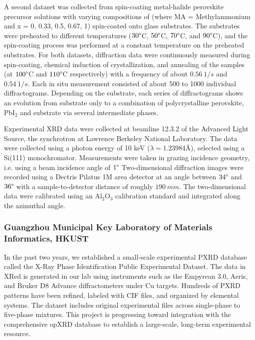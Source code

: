 A second dataset was collected from spin-coating metal-halide perovskite precursor solutions with varying compositions of  (where MA = Methylammonium and x = 0, 0.33, 0.5, 0.67, 1) spin-coated onto glass substrates. The substrates were preheated to different temperatures ($30\degree $C, $50\degree $C, $70\degree $C, and $90\degree $C), and the spin-coating process was performed at a constant temperature on the preheated substrates. For both datasets, diffraction data were continuously measured during spin-coating, chemical induction of crystallization, and annealing of the samples (at $100\degree$C and $110\degree$C respectively) with a frequency of about $0.56 
 \ 1/\si{s}$ and $0.54 \ 1/\si{s}$. Each in situ measurement consisted of about 500 to 1000 individual diffractograms. Depending on the substrate, each series of diffractograms shows an evolution from substrate only to a combination of polycrystalline perovskite, PbI$_{2}$ and substrate via several intermediate phases.

Experimental XRD data were collected at beamline 12.3.2 of the Advanced Light Source, the synchrotron at Lawrence Berkeley National Laboratory. The data were collected using a photon energy of 10 keV ($\lambda = 1.23984 \text{\AA}$), selected using a Si(111) monochromator. Measurements were taken in grazing incidence geometry, i.e. using a beam incidence angle of $1\degree$ Two-dimensional diffraction images were recorded using a Dectris Pilatus 1M area detector at an angle between $34\degree$ and $36\degree$ with a sample-to-detector distance of roughly $190 \ \si{mm}$. The two-dimensional data were calibrated using an Al$_{2}$O$_{3}$ calibration standard and integrated along the azimuthal angle. \\


\subsubsection*{Guangzhou Municipal Key Laboratory of Materials Informatics, HKUST}

In the past two years, we established a small-scale experimental PXRD database called the X-Ray Phase Identification Public Experimental Dataset. The data in XRed is generated in our lab using instruments such as the Empyrean 3.0, Aeris, and Bruker D8 Advance diffractometers under Cu targets. Hundreds of PXRD patterns have been refined, labeled with CIF files, and organized by elemental systems. The dataset includes original experimental files across single-phase to five-phase mixtures. This project is progressing toward integration with the comprehensive opXRD database to establish a large-scale, long-term experimental resource. 

